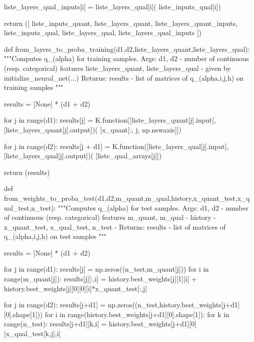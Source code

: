 \begin{pylisting}
            liste_layers_qual_inputs[i] = liste_layers_qual[i](
                liste_inputs_qual[i])

        return ([
            liste_inputs_quant, liste_layers_quant, liste_layers_quant_inputs,
            liste_inputs_qual, liste_layers_qual, liste_layers_qual_inputs
        ])
    
    
    def from_layers_to_proba_training(d1,d2,liste_layers_quant,liste_layers_qual):
        """Computes q_(alpha) for training samples.
	    Args:
	       d1, d2 - number of continuous (resp. categorical) features
	       liste_layers_quant, liste_layers_qual - given by initialize_neural_net(...)
	    Returns:
			results - list of matrices of q_(alpha,i,j,h) on training samples
	    """

        results = [None] * (d1 + d2)

        for j in range(d1):
            results[j] = K.function([liste_layers_quant[j].input],
                                    [liste_layers_quant[j].output])(
                                        [x_quant[:, j, np.newaxis]])

        for j in range(d2):
            results[j + d1] = K.function([liste_layers_qual[j].input],
                                         [liste_layers_qual[j].output])(
                                             [liste_qual_arrays[j]])

        return (results)
    
    
    
    
    def from_weights_to_proba_test(d1,d2,m_quant,m_qual,history,x_quant_test,x_qual_test,n_test):
        """Computes q_(alpha) for test samples.
	    Args:
	       d1, d2 - number of continuous (resp. categorical) features
	       m_quant, m_qual - 
	       history - 
	       x_quant_test, x_qual_test, n_test - 
	    Returns:
			results - list of matrices of q_(alpha,i,j,h) on test samples
	    """
	    
        results = [None] * (d1 + d2)    

        for j in range(d1):
            results[j] = np.zeros((n_test,m_quant[j]))
            for i in range(m_quant[j]):
                results[j][:,i] = history.best_weights[j][1][i] + history.best_weights[j][0][0][i]*x_quant_test[:,j]


        for j in range(d2):
            results[j+d1] = np.zeros((n_test,history.best_weights[j+d1][0].shape[1]))
            for i in range(history.best_weights[j+d1][0].shape[1]):
                for k in range(n_test):
                    results[j+d1][k,i] = history.best_weights[j+d1][0][x_qual_test[k,j],i]


\end{pylisting}

